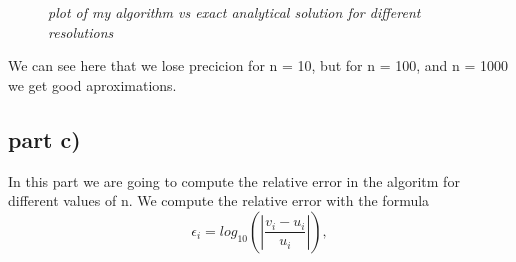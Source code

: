 \documentclass[norsk,a4paper,12pt]{article}
\begin{document}
\begin{figure}[H]
\begin{center}
  \end{center}
  \caption{\textit{plot of my algorithm vs exact analytical solution for different resolutions}}
  \label{fig:edge}
\end{figure}

We can see here that we lose precicion for n = 10, but for n = 100, and n = 1000 we get good aproximations.

\subsection*{part c)}

In this part we are going to compute the relative error in the algoritm for different values of n. We compute the relative error 
with the formula 
\begin{equation}
\epsilon_i=log_{10}\left(\left|\frac{v_i-u_i}
             {u_i}\right|\right),
\end{equation}
\end{document}
